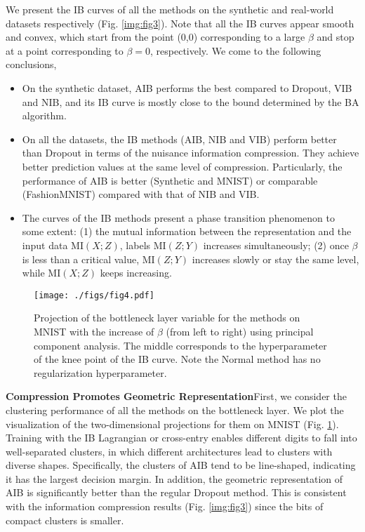 \documentclass[10pt,journal,compsoc]{IEEEtran}
\begin{document}
We present the IB curves of all the methods on the synthetic and real-world datasets respectively (Fig. \ref{img:fig3}). Note that all the IB curves appear smooth and convex, which start from the point (0,0) corresponding to a large $\beta$ and stop at a point corresponding to $\beta = 0$, respectively. We come to the following conclusions,
\begin{itemize}
\item On the synthetic dataset, AIB performs the best compared to Dropout, VIB and NIB, and its IB curve is mostly close to the bound determined by the BA algorithm.
\item On all the datasets, the IB methods (AIB, NIB and VIB) perform better than Dropout in terms of the nuisance information compression. They achieve better prediction values at the same level of compression. Particularly, the performance of AIB is better (Synthetic and MNIST) or comparable (FashionMNIST) compared with that of NIB and VIB.
\item The curves of the IB methods present a phase transition phenomenon to some extent: (1) the mutual information between the representation and the input data $\mathrm{MI}(X; Z)$, labels $\mathrm{MI}(Z; Y)$ increases simultaneously; (2) once $\beta$ is less than a critical value, $\mathrm{MI}(Z; Y)$ increases slowly or stay the same level, while $\mathrm{MI}(X; Z)$ keeps increasing. 
\end{itemize}

\begin{figure}
	\centering
	\texttt{[image: ./figs/fig4.pdf]}
	\caption{Projection of the bottleneck layer variable for the methods on MNIST with the increase of $\beta$ (from left to right) using principal component analysis. The middle corresponds to the hyperparameter of the knee point of the IB curve. Note the Normal method has no regularization hyperparameter.}
	\label{img:fig4}
\end{figure}

\noindent \textbf{Compression Promotes Geometric Representation}\quad First, we consider the clustering performance of all the methods on the bottleneck layer. We plot the visualization of the two-dimensional projections for them on MNIST (Fig. \ref{img:fig4}). 
Training with the IB Lagrangian or cross-entry enables different digits to fall into well-separated clusters, in which different architectures lead to clusters with diverse shapes. Specifically, the clusters of AIB tend to be line-shaped, indicating it has the largest decision margin. In addition, the geometric representation of AIB is significantly better than the regular Dropout method. This is consistent with the information compression results (Fig. \ref{img:fig3}) since the bits of compact clusters is smaller.
\end{document}
